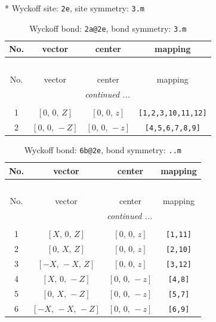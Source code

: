 \documentclass[fleqn,8pt]{jsarticle}
\begin{document}
* Wyckoff site: {\tt 2e}, site symmetry: {\tt 3.m}
\renewcommand{\arraystretch}{1.2}
\begin{longtable}{cccc}
\caption{Wyckoff bond: {\tt 2a@2e}, bond symmetry: {\tt 3.m}}
 \\
 \hline \hline
No. & vector & center & mapping \\ \hline \endfirsthead

\multicolumn{3}{l}{\tablename\ \thetable{}} \\
 \hline \hline
No. & vector & center & mapping \\ \hline \endhead

 \hline \hline
\multicolumn{3}{r}{\footnotesize\it continued ...} \\ \endfoot

 \hline \hline
\multicolumn{3}{r}{} \\ \endlastfoot

1 & $\left[ 0,\, 0,\, Z \right]$ & $\left[ 0,\, 0,\, z \right]$ & {\tt [1,2,3,10,11,12]} \\ \hline
2 & $\left[ 0,\, 0,\, - Z \right]$ & $\left[ 0,\, 0,\, - z \right]$ & {\tt [4,5,6,7,8,9]} \\
\end{longtable}
\renewcommand{\arraystretch}{1.2}
\begin{longtable}{cccc}
\caption{Wyckoff bond: {\tt 6b@2e}, bond symmetry: {\tt ..m}}
 \\
 \hline \hline
No. & vector & center & mapping \\ \hline \endfirsthead

\multicolumn{3}{l}{\tablename\ \thetable{}} \\
 \hline \hline
No. & vector & center & mapping \\ \hline \endhead

 \hline \hline
\multicolumn{3}{r}{\footnotesize\it continued ...} \\ \endfoot

 \hline \hline
\multicolumn{3}{r}{} \\ \endlastfoot

1 & $\left[ X,\, 0,\, Z \right]$ & $\left[ 0,\, 0,\, z \right]$ & {\tt [1,11]} \\ \hline
2 & $\left[ 0,\, X,\, Z \right]$ & $\left[ 0,\, 0,\, z \right]$ & {\tt [2,10]} \\ \hline
3 & $\left[ - X,\, - X,\, Z \right]$ & $\left[ 0,\, 0,\, z \right]$ & {\tt [3,12]} \\ \hline
4 & $\left[ X,\, 0,\, - Z \right]$ & $\left[ 0,\, 0,\, - z \right]$ & {\tt [4,8]} \\ \hline
5 & $\left[ 0,\, X,\, - Z \right]$ & $\left[ 0,\, 0,\, - z \right]$ & {\tt [5,7]} \\ \hline
6 & $\left[ - X,\, - X,\, - Z \right]$ & $\left[ 0,\, 0,\, - z \right]$ & {\tt [6,9]} \\
\end{longtable}
\end{document}
